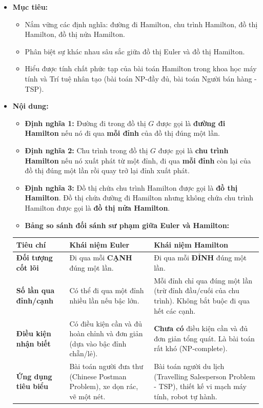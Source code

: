 \documentclass[12pt, a4paper]{article}
\begin{document}
\begin{itemize}[leftmargin=1.2cm]
    \item[a)] \textbf{Mục tiêu:}
    \begin{itemize}[leftmargin=0.6cm]
        \item Nắm vững các định nghĩa: đường đi Hamilton, chu trình Hamilton, đồ thị Hamilton, đồ thị nửa Hamilton.
        \item Phân biệt sự khác nhau sâu sắc giữa đồ thị Euler và đồ thị Hamilton.
        \item Hiểu được tính chất phức tạp của bài toán Hamilton trong khoa học máy tính và Trí tuệ nhân tạo (bài toán NP-đầy đủ, bài toán Người bán hàng - TSP).
    \end{itemize}

    \item[b)] \textbf{Nội dung:}
    \begin{itemize}[leftmargin=0.6cm]
        \item \textbf{Định nghĩa 1:} Đường đi trong đồ thị $G$ được gọi là \textbf{đường đi Hamilton} nếu nó đi qua \textbf{mỗi đỉnh} của đồ thị đúng một lần.
        \item \textbf{Định nghĩa 2:} Chu trình trong đồ thị $G$ được gọi là \textbf{chu trình Hamilton} nếu nó xuất phát từ một đỉnh, đi qua \textbf{mỗi đỉnh} còn lại của đồ thị đúng một lần rồi quay trở lại đỉnh xuất phát.
        \item \textbf{Định nghĩa 3:} Đồ thị chứa chu trình Hamilton được gọi là \textbf{đồ thị Hamilton}. Đồ thị chứa đường đi Hamilton nhưng không chứa chu trình Hamilton được gọi là \textbf{đồ thị nửa Hamilton}.
        \item \textbf{Bảng so sánh đối sánh sư phạm giữa Euler và Hamilton:}
    \end{itemize}

    \begin{center}
    \begin{tabularx}{\textwidth}{|>{\bfseries}p{3.2cm}|X|X|}
    \hline
    \textbf{Tiêu chí} & \textbf{Khái niệm Euler} & \textbf{Khái niệm Hamilton} \\ \hline
    Đối tượng cốt lõi & Đi qua mỗi \textbf{CẠNH} đúng một lần. & Đi qua mỗi \textbf{ĐỈNH} đúng một lần. \\ \hline
    Số lần qua đỉnh/cạnh & Có thể đi qua một đỉnh nhiều lần nếu bậc lớn. & Mỗi đỉnh chỉ qua đúng một lần (trừ đỉnh đầu/cuối của chu trình). Không bắt buộc đi qua hết các cạnh. \\ \hline
    Điều kiện nhận biết & Có điều kiện cần và đủ hoàn chỉnh và đơn giản (dựa vào bậc đỉnh chẵn/lẻ). & \textbf{Chưa có} điều kiện cần và đủ đơn giản tổng quát. Là bài toán rất khó (NP-complete). \\ \hline
    Ứng dụng tiêu biểu & Bài toán người đưa thư (Chinese Postman Problem), xe dọn rác, vẽ một nét. & Bài toán người du lịch (Travelling Salesperson Problem - TSP), thiết kế vi mạch máy tính, robot tự hành. \\ \hline
    \end{tabularx}
    \end{center}


\end{itemize}
\end{document}
